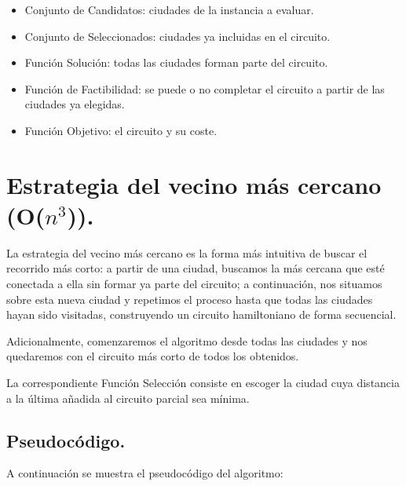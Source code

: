 \documentclass[11pt,a4paper]{article}
\begin{document}
		\begin{itemize}

			\item
			Conjunto de Candidatos: ciudades de la instancia a evaluar.
			\item
			Conjunto de Seleccionados: ciudades ya incluidas en el circuito.
			\item
			Función Solución: todas las ciudades forman parte del circuito.
			\item
			Función de Factibilidad: se puede o no completar el circuito a partir de las ciudades ya elegidas.
			\item
			Función Objetivo: el circuito y su coste.

		\end{itemize}

\newpage

	\section{Estrategia del vecino más cercano (O($n^3$)).}

		\par
		La estrategia del vecino más cercano es la forma más intuitiva de buscar el recorrido más corto: a partir de una ciudad, buscamos la más cercana que esté conectada a ella sin formar ya parte del circuito; a continuación, nos situamos sobre esta nueva ciudad y repetimos el proceso hasta que todas las ciudades hayan sido visitadas, construyendo un circuito hamiltoniano de forma secuencial.

		\par
		Adicionalmente, comenzaremos el algoritmo desde todas las ciudades y nos quedaremos con el circuito más corto de todos los obtenidos.

		\par
		La correspondiente Función Selección consiste en escoger la ciudad cuya distancia a la última añadida al circuito parcial sea mínima.

		\subsection{Pseudocódigo.}

			\par
			A continuación se muestra el pseudocódigo del algoritmo:

			\vspace{2mm}
\end{document}
